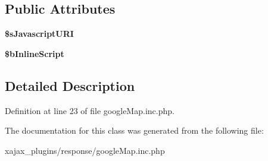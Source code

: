 \subsection*{Public Attributes}
\begin{DoxyCompactItemize}
\item 
\hypertarget{classclsGoogleMap_a6dfcdb1b7ab776d43d048633107fe7a1}{
{\bfseries \$sJavascriptURI}}
\label{classclsGoogleMap_a6dfcdb1b7ab776d43d048633107fe7a1}

\item 
\hypertarget{classclsGoogleMap_a80916c730906f660153bdb3d0aed8fc3}{
{\bfseries \$bInlineScript}}
\label{classclsGoogleMap_a80916c730906f660153bdb3d0aed8fc3}

\end{DoxyCompactItemize}


\subsection{Detailed Description}


Definition at line 23 of file googleMap.inc.php.



The documentation for this class was generated from the following file:\begin{DoxyCompactItemize}
\item 
xajax\_\-plugins/response/googleMap.inc.php\end{DoxyCompactItemize}
